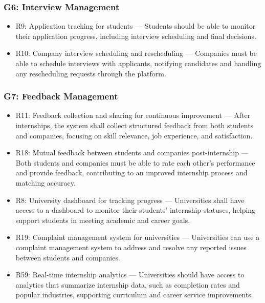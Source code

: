 \subsubsection{G6: Interview Management}
    \begin{itemize}
        \item R9: Application tracking for students — Students should be able to monitor their application progress, including interview scheduling and final decisions.
        \item R10: Company interview scheduling and rescheduling — Companies must be able to schedule interviews with applicants, notifying candidates and handling any rescheduling requests through the platform.
    \end{itemize}
    
\subsubsection{G7: Feedback Management}
    \begin{itemize}
        \item R11: Feedback collection and sharing for continuous improvement — After internships, the system shall collect structured feedback from both students and companies, focusing on skill relevance, job experience, and satisfaction.
        \item R18: Mutual feedback between students and companies post-internship — Both students and companies must be able to rate each other’s performance and provide feedback, contributing to an improved internship process and matching accuracy.
    \end{itemize}
    \begin{itemize}
        \item R8: University dashboard for tracking progress — Universities shall have access to a dashboard to monitor their students' internship statuses, helping support students in meeting academic and career goals.
        \item R19: Complaint management system for universities — Universities can use a complaint management system to address and resolve any reported issues between students and companies.
        \item R59: Real-time internship analytics — Universities should have access to analytics that summarize internship data, such as completion rates and popular industries, supporting curriculum and career service improvements.
    \end{itemize}




